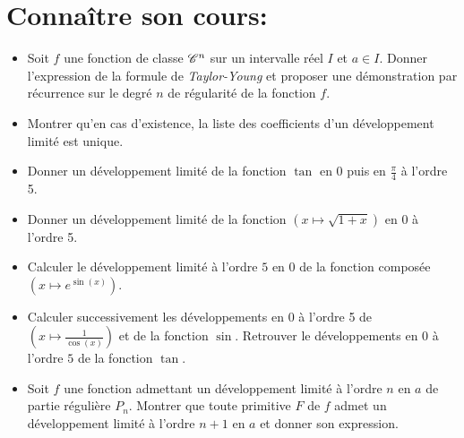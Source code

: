 \documentclass[a4paper,11pt]{article}
\theoremstyle{definition}
\begin{document}
 
 
 
 
 
 
	

\noindent{}

\smallskip
\section*{Connaître son cours:}
\begin{itemize}[$\bullet$]
	\item Soit $f$ une fonction de classe $\mathscr{C}^n$ sur un intervalle réel $I$ et $a \in I$. Donner l'expression de la formule de \emph{Taylor-Young} et proposer une démonstration par récurrence sur le degré $n$ de régularité de la fonction $f$.
	\item Montrer qu'en cas d’existence, la liste des coefficients d’un
	développement limité est unique. %
	\item Donner un développement limité de la fonction $\tan$ en 0 puis en $\frac{\pi}{4}$ à l'ordre 5.
	\item Donner un développement limité de la fonction $\left( x \mapsto \sqrt{1 + x}\right)$ en 0 à l'ordre 5.
	\item Calculer le développement limité à l’ordre $5$ en $0$ de la fonction composée $\left(x \mapsto e^{\sin(x)}\right)$.
	\item Calculer successivement les développements en $0$ à l’ordre 5 de $\left( x \mapsto\frac{1}{\cos(x)}\right)$ et de la fonction $\sin$. Retrouver le développements en $0$ à l’ordre $5$ de la fonction $\tan$. 
	\item Soit $f$ une fonction admettant un développement limité à l’ordre $n$ en $a$ de partie régulière $P_n$. Montrer que toute primitive $F$ de $f$ admet un développement limité à l’ordre $n + 1$ en $a$ et donner son expression.
\end{itemize}
\end{document}
